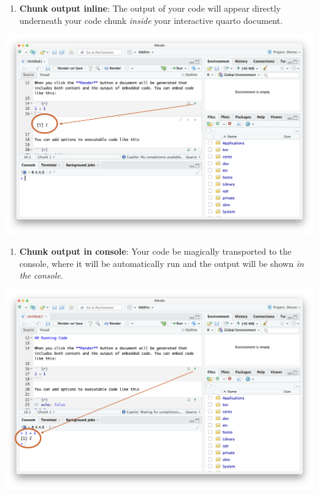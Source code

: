 \documentclass[
  letterpaper,
  DIV=11,
  numbers=noendperiod]{scrreprt}
\providecommand{\tightlist}{%
  \setlength{\itemsep}{0pt}\setlength{\parskip}{0pt}}\usepackage{longtable,booktabs,array}
\begin{document}
\begin{enumerate}
\def\labelenumi{\arabic{enumi}.}
\tightlist
\item
  \textbf{Chunk output inline}: The output of your code will appear
  directly underneath your code chunk \emph{inside} your interactive
  quarto document.
\end{enumerate}

\includegraphics[width=10.22in,height=\textheight]{figures/output_inline.png}

\begin{enumerate}
\def\labelenumi{\arabic{enumi}.}
\setcounter{enumi}{1}
\tightlist
\item
  \textbf{Chunk output in console}: Your code be magically transported
  to the console, where it will be automatically run and the output will
  be shown \emph{in the console}.
\end{enumerate}

\includegraphics[width=10.22in,height=\textheight]{figures/output_console.png}
\end{document}
